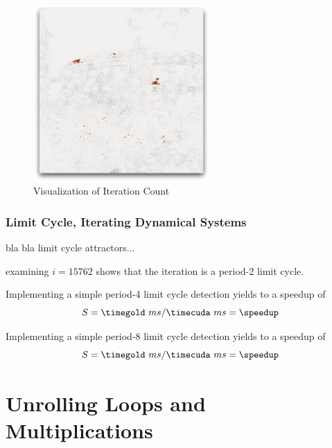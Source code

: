 \begin{figure}[ht]
\centering
\includegraphics[width=0.6\textwidth]{gfx/itr_limitcycle0.pdf}
\caption{Visualization of Iteration Count}
\label{fig:vis_iteration_count}
\end{figure}



\subsubsection{Limit Cycle, Iterating Dynamical Systems} %
\label{ssub:limit_cycle_iterating_dynamical_systems}
bla bla  limit cycle attractors...


examining $i = 15762$ shows that the iteration is a period-2 limit cycle.

Implementing a simple period-4 limit cycle detection yields to a speedup of
\fpDiv{\speedup}{\timegold}{\timecuda}
\begin{equation*}\label{eq:speedup9}
	S = \timegold\ ms/\timecuda\ ms = \speedup
\end{equation*}

Implementing a simple period-8 limit cycle detection yields to a speedup of
\fpDiv{\speedup}{\timegold}{\timecuda}
\begin{equation*}\label{eq:speedup10}
	S = \timegold\ ms/\timecuda\ ms = \speedup
\end{equation*}


\section{Unrolling Loops and Multiplications} %
\label{sec:unrolling_loops_and_multiplications}

